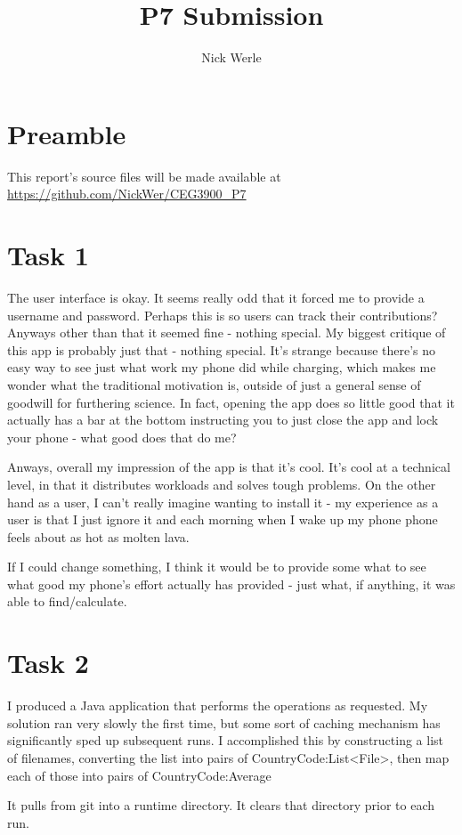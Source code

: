 \documentclass{article}
\author{Nick Werle}
\title{P7 Submission}
\begin{document}
\maketitle
\section{Preamble}
This report's source files will be made available at \url{https://github.com/NickWer/CEG3900_P7}

\section{Task 1}
The user interface is okay. It seems really odd that it forced me to provide a username and password. Perhaps this is so users can track their contributions? Anyways other than that it seemed fine - nothing special.
My biggest critique of this app is probably just that - nothing special.
It's strange because there's no easy way to see just what work my phone did while charging, which makes me wonder what the traditional motivation is, outside of just a general sense of goodwill for furthering science.
In fact, opening the app does so little good that it actually has a bar at the bottom instructing you to just close the app and lock your phone - what good does that do me?

Anways, overall my impression of the app is that it's cool. It's cool at a technical level, in that it distributes workloads and solves tough problems.
On the other hand as a user, I can't really imagine wanting to install it - my experience as a user is that I just ignore it and each morning when I wake up my phone phone feels about as hot as molten lava.

If I could change something, I think it would be to provide some what to see what good my phone's effort actually has provided - just what, if anything, it was able to find/calculate.

\section{Task 2}
I produced a Java application that performs the operations as requested.
My solution ran very slowly the first time, but some sort of caching mechanism has significantly sped up subsequent runs.
I accomplished this by constructing a list of filenames, converting the list into pairs of CountryCode:List<File>, then map each of those into pairs of CountryCode:Average

It pulls from git into a runtime directory. It clears that directory prior to each run.
\end{document}
